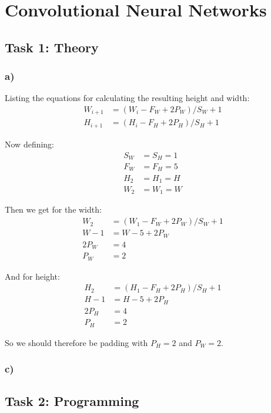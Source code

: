\section{Convolutional Neural Networks}
\subsection{Task 1: Theory}
\subsubsection*{a)}
Listing the equations for calculating the resulting height and width: 
\begin{align}
    W_{i + 1} &= (W_i - F_W + 2 P_W)/S_W + 1 \\
    H_{i + 1} &= (H_i - F_H + 2 P_H)/S_H + 1
\end{align}

Now defining: 
\begin{align*}
    S_W &= S_H = 1 \\
    F_W &= F_H = 5 \\
    H_2 &= H_1 = H \\
    W_2 &= W_1 = W
\end{align*}

Then we get for the width:
\begin{align*}
    W_2 &= (W_1 - F_W + 2 P_W)/S_W + 1 \\
    W - 1 &= W - 5 + 2 P_W \\
    2 P_W &= 4 \\
    P_W &= 2
\end{align*}

And for height: 
\begin{align*}
    H_2 &= (H_1 - F_H + 2 P_H)/S_H + 1 \\
    H - 1 &= H - 5 + 2 P_H \\
    2 P_H &= 4 \\
    P_H &= 2
\end{align*}

So we should therefore be padding with $P_H = 2$ and $P_W = 2$. 

\subsubsection*{c)}


\newpage
\subsection{Task 2: Programming}
